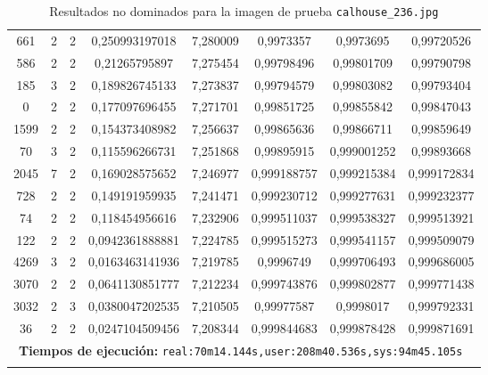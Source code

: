 \begin{longtable}{|c|c|c|c|c|c|c|c|}
661 & 2 & 2 & 0,250993197018 & 7,280009 & 0,9973357 & 0,9973695 & 0,99720526 \\
586 & 2 & 2 & 0,21265795897 & 7,275454 & 0,99798496 & 0,99801709 & 0,99790798 \\
185 & 3 & 2 & 0,189826745133 & 7,273837 & 0,99794579 & 0,99803082 & 0,99793404 \\
0 & 2 & 2 & 0,177097696455 & 7,271701 & 0,99851725 & 0,99855842 & 0,99847043 \\
1599 & 2 & 2 & 0,154373408982 & 7,256637 & 0,99865636 & 0,99866711 & 0,99859649 \\
70 & 3 & 2 & 0,115596266731 & 7,251868 & 0,99895915 & 0,999001252 & 0,99893668 \\
2045 & 7 & 2 & 0,169028575652 & 7,246977 & 0,999188757 & 0,999215384 & 0,999172834 \\
728 & 2 & 2 & 0,149191959935 & 7,241471 & 0,999230712 & 0,999277631 & 0,999232377 \\
74 & 2 & 2 & 0,118454956616 & 7,232906 & 0,999511037 & 0,999538327 & 0,999513921 \\
122 & 2 & 2 & 0,0942361888881 & 7,224785 & 0,999515273 & 0,999541157 & 0,999509079 \\
4269 & 3 & 2 & 0,0163463141936 & 7,219785 & 0,9996749 & 0,999706493 & 0,999686005 \\
3070 & 2 & 2 & 0,0641130851777 & 7,212234 & 0,999743876 & 0,999802877 & 0,999771438 \\
3032 & 2 & 3 & 0,0380047202535 & 7,210505 & 0,99977587 & 0,9998017 & 0,999792331 \\
36 & 2 & 2 & 0,0247104509456 & 7,208344 & 0,999844683 & 0,999878428 & 0,999871691 \\
\multicolumn{8}{|c|}{\textbf{Tiempos de ejecución:} \texttt{real:70m14.144s,user:208m40.536s,sys:94m45.105s
}}\\ \hline
\caption{Resultados no dominados para la imagen de prueba \texttt{calhouse\_236.jpg}}
\label{tab:calhouse_236}
\end{longtable}
\normalsize

